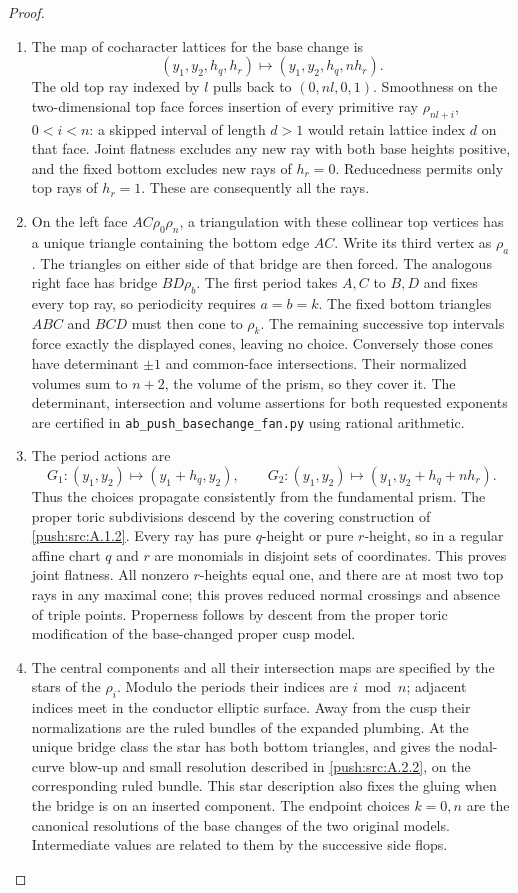 \begin{proof}
\begin{enumerate}[label=\arabic*.,leftmargin=*]
\item The map of cocharacter lattices for the base change is
\[
 (y_1,y_2,h_q,h_r)\longmapsto
 (y_1,y_2,h_q,nh_r).
\]
The old top ray indexed by $l$ pulls back to
$(0,nl,0,1)$. Smoothness on the two-dimensional top
face forces insertion of every primitive ray
$\rho_{nl+i}$, $0<i<n$: a skipped interval of length
$d>1$ would retain lattice index $d$ on that face.
Joint flatness excludes any new ray with both base
heights positive, and the fixed bottom excludes new
rays of $h_r=0$. Reducedness permits only top rays
of $h_r=1$. These are consequently all the rays.

\item On the left face $AC\rho_0\rho_n$, a triangulation
with these collinear top vertices has a unique triangle
containing the bottom edge $AC$. Write its third
vertex as $\rho_a$. The triangles on either side
of that bridge are then forced. The analogous right
face has bridge $BD\rho_b$. The first period takes
$A,C$ to $B,D$ and fixes every top ray, so periodicity
requires $a=b=k$. The fixed bottom triangles $ABC$
and $BCD$ must then cone to $\rho_k$. The remaining
successive top intervals force exactly the displayed
cones, leaving no choice. Conversely those cones
have determinant $\pm1$ and common-face
intersections. Their normalized volumes sum to
$n+2$, the volume of the prism, so they cover it.
The determinant, intersection and volume assertions
for both requested exponents are certified in
\texttt{ab\_push\_basechange\_fan.py} using rational
arithmetic.

\item The period actions are
\[
 G_1:(y_1,y_2)\mapsto(y_1+h_q,y_2),\qquad
 G_2:(y_1,y_2)\mapsto(y_1,y_2+h_q+nh_r).
\]
Thus the choices propagate consistently from the
fundamental prism. The proper toric subdivisions
descend by the covering construction of \ref{push:src:A.1.2}.
Every ray has pure $q$-height or pure $r$-height, so
in a regular affine chart $q$ and $r$ are monomials
in disjoint sets of coordinates. This proves joint
flatness. All nonzero $r$-heights equal one, and
there are at most two top rays in any maximal cone;
this proves reduced normal crossings and absence of
triple points. Properness follows by descent from
the proper toric modification of the base-changed
proper cusp model.

\item The central components and all their intersection
maps are specified by the stars of the $\rho_i$.
Modulo the periods their indices are $i\bmod n$;
adjacent indices meet in the conductor elliptic
surface. Away from the cusp their normalizations
are the ruled bundles of the expanded plumbing.
At the unique bridge class the star has both bottom
triangles, and gives the nodal-curve blow-up and
small resolution described in \ref{push:src:A.2.2}, on the
corresponding ruled bundle. This star description
also fixes the gluing when the bridge is on an
inserted component. The endpoint choices $k=0,n$
are the canonical resolutions of the base changes
of the two original models. Intermediate values
are related to them by the successive side flops.


\end{enumerate}
\end{proof}
